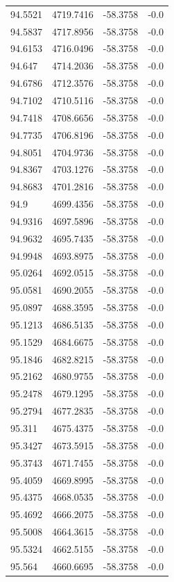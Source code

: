 \begin{table}[H]
\begin{tabular}{llll}
94.5521 & 4719.7416 & -58.3758 & -0.0 \\
94.5837 & 4717.8956 & -58.3758 & -0.0 \\
94.6153 & 4716.0496 & -58.3758 & -0.0 \\
94.647 & 4714.2036 & -58.3758 & -0.0 \\
94.6786 & 4712.3576 & -58.3758 & -0.0 \\
94.7102 & 4710.5116 & -58.3758 & -0.0 \\
94.7418 & 4708.6656 & -58.3758 & -0.0 \\
94.7735 & 4706.8196 & -58.3758 & -0.0 \\
94.8051 & 4704.9736 & -58.3758 & -0.0 \\
94.8367 & 4703.1276 & -58.3758 & -0.0 \\
94.8683 & 4701.2816 & -58.3758 & -0.0 \\
94.9 & 4699.4356 & -58.3758 & -0.0 \\
94.9316 & 4697.5896 & -58.3758 & -0.0 \\
94.9632 & 4695.7435 & -58.3758 & -0.0 \\
94.9948 & 4693.8975 & -58.3758 & -0.0 \\
95.0264 & 4692.0515 & -58.3758 & -0.0 \\
95.0581 & 4690.2055 & -58.3758 & -0.0 \\
95.0897 & 4688.3595 & -58.3758 & -0.0 \\
95.1213 & 4686.5135 & -58.3758 & -0.0 \\
95.1529 & 4684.6675 & -58.3758 & -0.0 \\
95.1846 & 4682.8215 & -58.3758 & -0.0 \\
95.2162 & 4680.9755 & -58.3758 & -0.0 \\
95.2478 & 4679.1295 & -58.3758 & -0.0 \\
95.2794 & 4677.2835 & -58.3758 & -0.0 \\
95.311 & 4675.4375 & -58.3758 & -0.0 \\
95.3427 & 4673.5915 & -58.3758 & -0.0 \\
95.3743 & 4671.7455 & -58.3758 & -0.0 \\
95.4059 & 4669.8995 & -58.3758 & -0.0 \\
95.4375 & 4668.0535 & -58.3758 & -0.0 \\
95.4692 & 4666.2075 & -58.3758 & -0.0 \\
95.5008 & 4664.3615 & -58.3758 & -0.0 \\
95.5324 & 4662.5155 & -58.3758 & -0.0 \\
95.564 & 4660.6695 & -58.3758 & -0.0 \\

\end{tabular}
\end{table}
